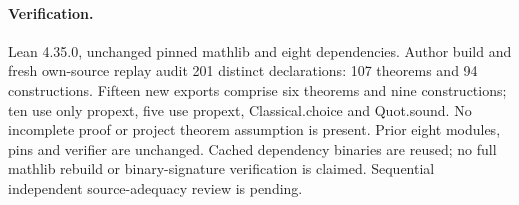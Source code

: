 \documentclass{article}
\begin{document}
\paragraph{Verification.} Lean 4.35.0, unchanged pinned mathlib and eight dependencies. Author build and fresh own-source replay audit 201 distinct declarations: 107 theorems and 94 constructions. Fifteen new exports comprise six theorems and nine constructions; ten use only propext, five use propext, Classical.choice and Quot.sound. No incomplete proof or project theorem assumption is present. Prior eight modules, pins and verifier are unchanged. Cached dependency binaries are reused; no full mathlib rebuild or binary-signature verification is claimed. Sequential independent source-adequacy review is pending.
\end{document}
